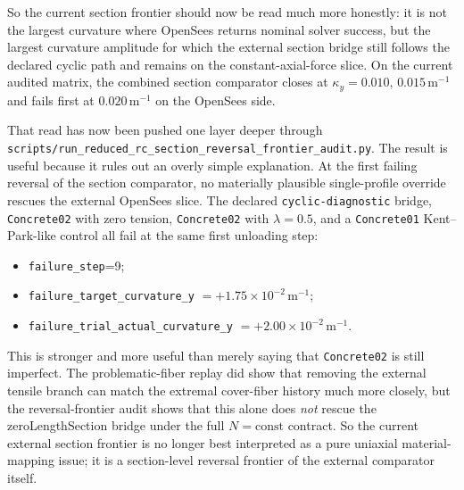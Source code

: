 So the current section frontier should now be read much more honestly: it is
not the largest curvature where OpenSees returns nominal solver success, but
the largest curvature amplitude for which the external section bridge still
follows the declared cyclic path and remains on the constant-axial-force
slice.  On the current audited matrix, the combined section comparator closes
at \(\kappa_y=0.010,\,0.015\,\mathrm{m}^{-1}\) and fails first at
\(0.020\,\mathrm{m}^{-1}\) on the OpenSees side.

That read has now been pushed one layer deeper through
\texttt{scripts/run\_reduced\_rc\_section\_reversal\_frontier\_audit.py}.  The
result is useful because it rules out an overly simple explanation.  At the
first failing reversal of the section comparator, no materially plausible
single-profile override rescues the external OpenSees slice.  The declared
\texttt{cyclic-diagnostic} bridge, \texttt{Concrete02} with zero tension,
\texttt{Concrete02} with \(\lambda = 0.5\), and a
\texttt{Concrete01} Kent--Park-like control all fail at the same first
unloading step:
\begin{itemize}
  \item \texttt{failure\_step}=9;
  \item \texttt{failure\_target\_curvature\_y}
    \(=+1.75\times10^{-2}\,\mathrm{m}^{-1}\);
  \item \texttt{failure\_trial\_actual\_curvature\_y}
    \(=+2.00\times10^{-2}\,\mathrm{m}^{-1}\).
\end{itemize}
This is stronger and more useful than merely saying that
\texttt{Concrete02} is still imperfect.  The problematic-fiber replay did show
that removing the external tensile branch can match the extremal cover-fiber
history much more closely, but the reversal-frontier audit shows that this
alone does \emph{not} rescue the zeroLengthSection bridge under the full
\(N=\mathrm{const}\) contract.  So the current external section frontier is no
longer best interpreted as a pure uniaxial material-mapping issue; it is a
section-level reversal frontier of the external comparator itself.

